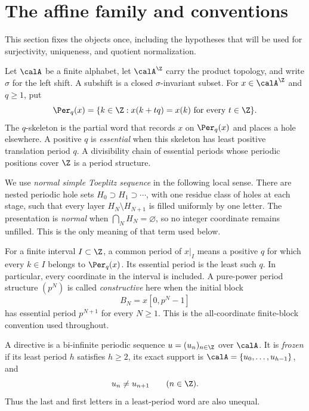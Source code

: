 \section{The affine family and conventions}
\label{sec:family}

This section fixes the objects once, including the hypotheses that will be
used for surjectivity, uniqueness, and quotient normalization.

Let $\calA$ be a finite alphabet, let $\calA^{\Z}$ carry the product
topology, and write $\sigma$ for the left shift.  A subshift is a closed
$\sigma$-invariant subset.  For $x\in\calA^{\Z}$ and $q\geq1$, put
\begin{equation}
  \Per_q(x)=\{k\in\Z:x(k+tq)=x(k)\text{ for every }t\in\Z\}.
  \label{eq:per-position}
\end{equation}
The $q$-skeleton is the partial word that records $x$ on $\Per_q(x)$ and
places a hole elsewhere.  A positive $q$ is \emph{essential} when this
skeleton has least positive translation period $q$.  A divisibility chain
of essential periods whose periodic positions cover $\Z$ is a period
structure.

We use \emph{normal simple Toeplitz sequence} in the following local sense.
There are nested periodic hole sets $H_0\supset H_1\supset\cdots$, with one
residue class of holes at each stage, such that every layer
$H_N\setminus H_{N+1}$ is filled uniformly by one letter.  The presentation
is \emph{normal} when $\bigcap_N H_N=\varnothing$, so no integer coordinate
remains unfilled.  This is the only meaning of that term used below.

For a finite interval $I\subset\Z$, a common period of $x|_I$ means a
positive $q$ for which every $k\in I$ belongs to $\Per_q(x)$.  Its
essential period is the least such $q$.  In particular, every coordinate
in the interval is included.  A pure-power period structure $(p^N)$ is
called \emph{constructive} here when the initial block
\begin{equation}
  B_N=x[0,p^N-1]
  \label{eq:initial-block}
\end{equation}
has essential period $p^{N+1}$ for every $N\geq1$.  This is the
all-coordinate finite-block convention used throughout.

\begin{definition}
  A directive is a bi-infinite periodic sequence
  $u=(u_n)_{n\in\Z}$ over $\calA$.  It is \emph{frozen} if its least period
  $h$ satisfies $h\geq2$, its exact support is
  $\calA=\{u_0,\dots,u_{h-1}\}$, and
  \begin{equation}
    u_n\neq u_{n+1}\qquad(n\in\Z).
    \label{eq:neighbor-distinct}
  \end{equation}
  Thus the last and first letters in a least-period word are also unequal.
\end{definition}


